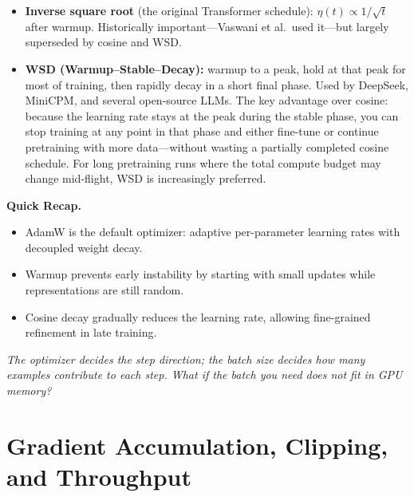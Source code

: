 \begin{itemize}[nosep]
  \item \textbf{Inverse square root} (the original Transformer schedule): $\eta(t) \propto 1/\sqrt{t}$ after warmup. Historically important---Vaswani et al.\ used it---but largely superseded by cosine and WSD.
  \item \textbf{WSD (Warmup--Stable--Decay):} warmup to a peak, hold at that peak for most of training, then rapidly decay in a short final phase. Used by DeepSeek, MiniCPM, and several open-source LLMs. The key advantage over cosine: because the learning rate stays at the peak during the stable phase, you can stop training at any point in that phase and either fine-tune or continue pretraining with more data---without wasting a partially completed cosine schedule. For long pretraining runs where the total compute budget may change mid-flight, WSD is increasingly preferred.
\end{itemize}


\begin{quickrecap}
\textbf{Quick Recap.}
\begin{itemize}[nosep,leftmargin=1.5em]
  \item AdamW is the default optimizer: adaptive per-parameter learning rates with decoupled weight decay.
  \item Warmup prevents early instability by starting with small updates while representations are still random.
  \item Cosine decay gradually reduces the learning rate, allowing fine-grained refinement in late training.
\end{itemize}
\textit{The optimizer decides the step direction; the batch size decides how many examples contribute to each step. What if the batch you need does not fit in GPU memory?}
\end{quickrecap}


\section{Gradient Accumulation, Clipping, and Throughput}

